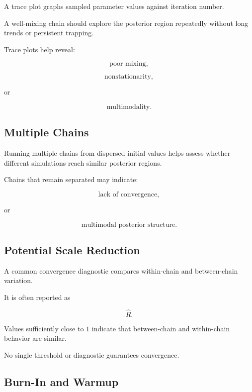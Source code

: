 A trace plot graphs sampled parameter values against iteration number.

A well-mixing chain should explore the posterior region repeatedly
without long trends or persistent trapping.

Trace plots help reveal:

\[
\boxed{
\text{poor mixing},
}
\]

\[
\boxed{
\text{nonstationarity},
}
\]

or

\[
\boxed{
\text{multimodality}.
}
\]

\subsection{Multiple Chains}
\label{subsec:mcmc-multiple-chains}

Running multiple chains from dispersed initial values helps assess
whether different simulations reach similar posterior regions.

Chains that remain separated may indicate:

\[
\boxed{
\text{lack of convergence},
}
\]

or

\[
\boxed{
\text{multimodal posterior structure}.
}
\]

\subsection{Potential Scale Reduction}
\label{subsec:rhat-preview}

A common convergence diagnostic compares within-chain and between-chain
variation.

It is often reported as

\[
\boxed{
\widehat{R}.
}
\]

Values sufficiently close to \(1\) indicate that between-chain and
within-chain behavior are similar.

No single threshold or diagnostic guarantees convergence.

\subsection{Burn-In and Warmup}
\label{subsec:mcmc-warmup}

